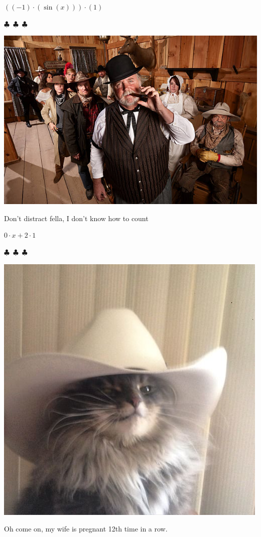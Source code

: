 \documentclass{article}
\begin{document}
\begin{center}$
{{({{({-1})}\cdot{({\sin{({x})}})}})}\cdot{({1})}}
$\end{center}
\begin{center} $\clubsuit$~$\clubsuit$~$\clubsuit$ \end{center}\begin{center} \includegraphics[scale=1.4]{funny_pics/funny_bartender.jpg} \end{center} Don't distract fella, I don't know how to count
\begin{center}$
{{{0}\cdot{x}}+{{2}\cdot{1}}}
$\end{center}
\begin{center} $\clubsuit$~$\clubsuit$~$\clubsuit$ \end{center}\begin{center}  \includegraphics[scale=0.3]{funny_pics/cowboy_cat.jpg} \end{center}Oh come on, my wife is pregnant 12th time in a row.
\end{document}
